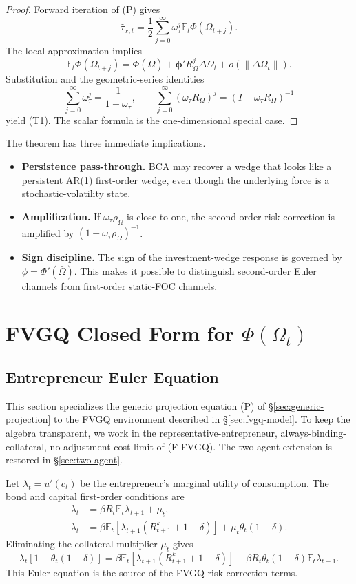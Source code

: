 \documentclass[11pt]{article}
\newcommand{\E}{\mathbb{E}}
\theoremstyle{plain}
\theoremstyle{definition}
\begin{document}
\begin{proof}
Forward iteration of (P) gives
\[
\hat\tau_{x,t}
=
\frac{1}{2}\sum_{j=0}^{\infty}\omega_\tau^j\E_t\Phi(\Omega_{t+j}).
\]
The local approximation implies
\[
\E_t\Phi(\Omega_{t+j})
=
\Phi(\bar\Omega)+\bm{\phi}'R_\Omega^j\Delta\Omega_t+o(\|\Delta\Omega_t\|).
\]
Substitution and the geometric-series identities
\[
\sum_{j=0}^{\infty}\omega_\tau^j=\frac{1}{1-\omega_\tau},
\qquad
\sum_{j=0}^{\infty}(\omega_\tau R_\Omega)^j
=(I-\omega_\tau R_\Omega)^{-1}
\]
yield (T1). The scalar formula is the one-dimensional special case.
\end{proof}

The theorem has three immediate implications.
\begin{itemize}
  \item \textbf{Persistence pass-through.} BCA may recover a wedge that looks
  like a persistent AR(1) first-order wedge, even though the underlying force is
  a stochastic-volatility state.
  \item \textbf{Amplification.} If $\omega_\tau\rho_\Omega$ is close to one,
  the second-order risk correction is amplified by
  $(1-\omega_\tau\rho_\Omega)^{-1}$.
  \item \textbf{Sign discipline.} The sign of the investment-wedge response is
  governed by $\phi=\Phi'(\bar\Omega)$. This makes it possible to distinguish
  second-order Euler channels from first-order static-FOC channels.
\end{itemize}

\section{FVGQ Closed Form for \texorpdfstring{$\Phi(\Omega_t)$}{Phi(Omega)}}
\label{sec:fvgq-closed-form}

\subsection{Entrepreneur Euler Equation}

This section specializes the generic projection equation (P) of
§\ref{sec:generic-projection} to the FVGQ environment described in
§\ref{sec:fvgq-model}. To keep the algebra transparent, we work in the
representative-entrepreneur, always-binding-collateral, no-adjustment-cost
limit of (F-FVGQ). The two-agent extension is restored in
§\ref{sec:two-agent}.

Let $\lambda_t=u'(c_t)$ be the entrepreneur's marginal utility of
consumption. The bond and capital first-order conditions are
\begin{align}
\lambda_t &= \beta R_t\E_t\lambda_{t+1}+\mu_t, \tag{F1}\\
\lambda_t &= \beta\E_t[\lambda_{t+1}(R^k_{t+1}+1-\delta)]
+\mu_t\theta_t(1-\delta). \tag{F2}
\end{align}
Eliminating the collateral multiplier $\mu_t$ gives
\begin{equation}
\lambda_t[1-\theta_t(1-\delta)]
=
\beta\E_t[\lambda_{t+1}(R^k_{t+1}+1-\delta)]
-\beta R_t\theta_t(1-\delta)\E_t\lambda_{t+1}.
\tag{E-Euler}
\end{equation}
This Euler equation is the source of the FVGQ risk-correction terms.
\end{document}
